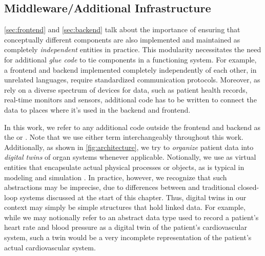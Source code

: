 \subsection{Middleware/Additional Infrastructure}\label{sec:middleware}

\autoref{sec:frontend} and \autoref{sec:backend} talk about
the importance of ensuring that conceptually different components are
also implemented and maintained as completely \emph{independent} entities
in practice. This modularity necessitates the need for additional
\emph{glue code} to tie components in a functioning system. For example,
a frontend and backend implemented completely independently of each
other, in unrelated languages, require standardized communication
protocols. Moreover, as \CDSSs{} rely on a diverse spectrum of devices for
data, such as patient health records, real-time monitors and sensors, additional
code has to be written to connect the data to places where it's used in
the backend and frontend.

In this work, we refer to any additional code outside the frontend and
backend as the  or .
Note that we use either term interchangeably throughout this work.
Additionally, as shown in \autoref{fig:architecture},
we try to \emph{organize} patient
data into \emph{digital twins} of organ systems whenever applicable.
Notionally, we use  as virtual entities that encapsulate
actual physical processes or objects,
as is typical in modeling and simulation \cite{TaoJMS22}.
In practice, however, we recognize that such abstractions may be
imprecise, due to differences between \CDSSs{} and traditional
closed-loop systems discussed at the start of this chapter. Thus,
digital twins in our context may simply be simple structures that
hold linked data. For example, while we may notionally refer to an abstract data type
used to record a patient's heart rate and blood pressure as a digital twin of
the patient's cardiovascular system, such a twin would be a very incomplete
representation of the patient's actual cardiovascular system.

